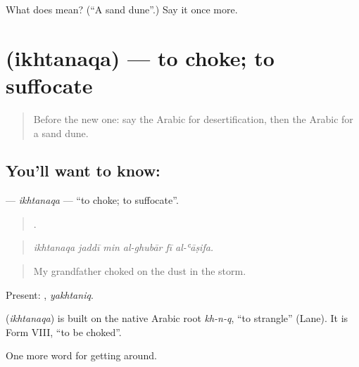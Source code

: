 \begin{tcolorbox}[breakable,colback=teal!4,colframe=teal!35!black,title={Before you move on}]
What does  mean? (\textquotedblleft{}A sand dune\textquotedblright{}.) Say it once more.
\end{tcolorbox}
\section[\texorpdfstring{\ar{اختنق} (ikhtanaqa)}{اختنق (ikhtanaqa)}]{ (ikhtanaqa) — to choke; to suffocate}

\label{lesson:AR-C466-ikhtanaqa}



\begin{quote}
Before the new one: say the Arabic for desertification, then the Arabic for a sand dune.
\end{quote}

\subsection*{You'll want to know: }
\textbf{} — \emph{ikhtanaqa} — \textquotedblleft{}to choke; to suffocate\textquotedblright{}.

\begin{quote}
     .
\end{quote}

\begin{quote}
\emph{ikhtanaqa jaddī min al-ghubār fī al-ʿāṣifa.}
\end{quote}

\begin{quote}
My grandfather choked on the dust in the storm.
\end{quote}

Present: , \emph{yakhtaniq}.

\begin{cousinweb}
\textbf{} (\emph{ikhtanaqa}) is built on the native Arabic root \emph{kh-n-q}, \textquotedblleft{}to strangle\textquotedblright{} (Lane). It is Form VIII, \textquotedblleft{}to be choked\textquotedblright{}.
\end{cousinweb}

\begin{grammarlens}[title={What you've built}]
One more word for getting around.
\end{grammarlens}

